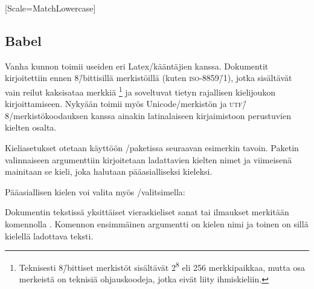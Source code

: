 \begin{koodilohkosis}
  [Scale=MatchLowercase]
\end{koodilohkosis}


%


\subsection{Babel}

Vanha kunnon  toimii useiden eri Latex\-/kääntäjien
kanssa. Dokumentit kirjoitettiin ennen 8\=/bittisillä merkistöillä
(kuten \textsc{iso-8859\=/1}), jotka sisältävät vain reilut kaksisataa
merkkiä%
\footnote{Teknisesti 8\=/bittiset merkistöt sisältävät
  2\textsuperscript8 eli 256 merkkipaikkaa, mutta osa merkeistä on
  teknisiä ohjauskoodeja, jotka eivät liity ihmiskieliin.} %
ja soveltuvat tietyn rajallisen kielijoukon kirjoittamiseen. Nykyään
 toimii myös Unicode\-/merkistön ja
\textsc{utf\=/8}\-/merkistökoodauksen kanssa ainakin latinalaiseen
kirjaimistoon perustuvien kielten osalta.

Kieliasetukset otetaan käyttöön \-/paketissa seuraavan
esimerkin tavoin. Paketin valinnaiseen argumenttiin kirjoitetaan
ladattavien kielten nimet ja viimeisenä mainitaan se kieli, joka
halutaan pääasialliseksi kieleksi.

\begin{koodilohkosis}
  \usepackage[english,greek,finnish]{babel}
\end{koodilohkosis}

Pääasiallisen kielen voi valita myös \-/valitsimella:

\begin{koodilohkosis}
  \usepackage[main=finnish,english,greek]{babel}
\end{koodilohkosis}

Dokumentin tekstissä yksittäiset vieraskieliset sanat tai ilmaukset
merkitään komennolla . Komennon
ensimmäinen argumentti on kielen nimi ja toinen on sillä kielellä
ladottava teksti.

